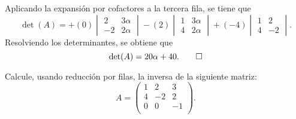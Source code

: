 \documentclass[11pt,respuestas,a4]{aleph-examen}
\begin{document}
\begin{preguntas}
\begin{respuesta}
    Aplicando la expansión por cofactores a la tercera fila, se tiene que
    \[
        \det(A) = + (0) \begin{vmatrix}
            2 & 3\alpha \\
            -2 & 2\alpha
        \end{vmatrix} - (2) \begin{vmatrix}
            1 & 3\alpha \\
            4 & 2\alpha
        \end{vmatrix} + (-4)\begin{vmatrix}  
            1 & 2 \\
            4 & -2
        \end{vmatrix}.
    \]
    Resolviendo los determinantes, se obtiene que
    \[
        \det(A) = 20\alpha + 40. \qedhere
    \]
\end{respuesta}

\item
    Calcule, usando reducción por filas, la inversa de la siguiente matriz:
    \[
    	A=\begin{pmatrix}
    	  1 & 2 & 3 \\
            4 & -2 & 2 \\
            0 & 0 & -1 \\
    	\end{pmatrix}.
    \]


\end{preguntas}
\end{document}
